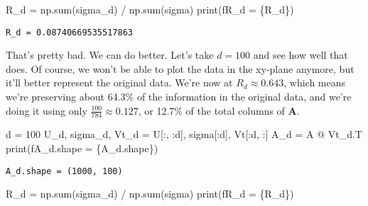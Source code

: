 \documentclass[
  letterpaper,
  DIV=11,
  numbers=noendperiod]{scrreprt}
\newenvironment{Shaded}{\begin{snugshade}}{\end{snugshade}}
\newcommand{\BuiltInTok}[1]{\textcolor[rgb]{0.00,0.23,0.31}{#1}}
\newcommand{\DecValTok}[1]{\textcolor[rgb]{0.68,0.00,0.00}{#1}}
\newcommand{\NormalTok}[1]{\textcolor[rgb]{0.00,0.23,0.31}{#1}}
\newcommand{\OperatorTok}[1]{\textcolor[rgb]{0.37,0.37,0.37}{#1}}
\newcommand{\SpecialCharTok}[1]{\textcolor[rgb]{0.37,0.37,0.37}{#1}}
\newcommand{\SpecialStringTok}[1]{\textcolor[rgb]{0.13,0.47,0.30}{#1}}
\begin{document}
\begin{Shaded}
\begin{Highlighting}[]
\NormalTok{R\_d }\OperatorTok{=}\NormalTok{ np.}\BuiltInTok{sum}\NormalTok{(sigma\_d) }\OperatorTok{/}\NormalTok{ np.}\BuiltInTok{sum}\NormalTok{(sigma)}
\BuiltInTok{print}\NormalTok{(}\SpecialStringTok{f\textquotesingle{}R\_d = }\SpecialCharTok{\{}\NormalTok{R\_d}\SpecialCharTok{\}}\SpecialStringTok{\textquotesingle{}}\NormalTok{)}
\end{Highlighting}
\end{Shaded}

\begin{verbatim}
R_d = 0.08740669535517863
\end{verbatim}

That's pretty bad. We can do better. Let's take \(d=100\) and see how
well that does. Of course, we won't be able to plot the data in the
xy-plane anymore, but it'll better represent the original data. We're
now at \(R_d \approx 0.643\), which means we're preserving about 64.3\%
of the information in the original data, and we're doing it using only
\(\frac{100}{784} \approx 0.127\), or 12.7\% of the total columns of
\(\mathbf{A}\).

\begin{Shaded}
\begin{Highlighting}[]
\NormalTok{d }\OperatorTok{=} \DecValTok{100}
\NormalTok{U\_d, sigma\_d, Vt\_d }\OperatorTok{=}\NormalTok{ U[:, :d], sigma[:d], Vt[:d, :]}
\NormalTok{A\_d }\OperatorTok{=}\NormalTok{ A }\OperatorTok{@}\NormalTok{ Vt\_d.T}
\BuiltInTok{print}\NormalTok{(}\SpecialStringTok{f\textquotesingle{}A\_d.shape = }\SpecialCharTok{\{}\NormalTok{A\_d}\SpecialCharTok{.}\NormalTok{shape}\SpecialCharTok{\}}\SpecialStringTok{\textquotesingle{}}\NormalTok{)}
\end{Highlighting}
\end{Shaded}

\begin{verbatim}
A_d.shape = (1000, 100)
\end{verbatim}

\begin{Shaded}
\begin{Highlighting}[]
\NormalTok{R\_d }\OperatorTok{=}\NormalTok{ np.}\BuiltInTok{sum}\NormalTok{(sigma\_d) }\OperatorTok{/}\NormalTok{ np.}\BuiltInTok{sum}\NormalTok{(sigma)}
\BuiltInTok{print}\NormalTok{(}\SpecialStringTok{f\textquotesingle{}R\_d = }\SpecialCharTok{\{}\NormalTok{R\_d}\SpecialCharTok{\}}\SpecialStringTok{\textquotesingle{}}\NormalTok{)}
\end{Highlighting}
\end{Shaded}
\end{document}
